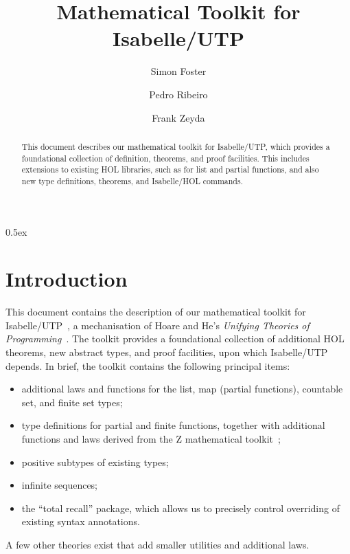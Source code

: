 \documentclass[11pt,a4paper]{article}
\begin{document}
\title{Mathematical Toolkit for Isabelle/UTP}

\author{Simon Foster \and Pedro Ribeiro \and Frank Zeyda}

\maketitle

\begin{abstract}
This document describes our mathematical toolkit for Isabelle/UTP, which provides a foundational
collection of definition, theorems, and proof facilities. This includes extensions to existing
HOL libraries, such as for list and partial functions, and also new type definitions, theorems, and 
Isabelle/HOL commands.
\end{abstract}

\tableofcontents

\parindent 0pt\parskip 0.5ex

\section{Introduction}

This document contains the description of our mathematical toolkit for 
Isabelle/UTP~\cite{Feliachi2010,Foster14c,Foster16a,Foster16c}, a mechanisation of Hoare and He's 
\emph{Unifying Theories of Programming}~\cite{Hoare&98,Cavalcanti&06}. The toolkit provides a 
foundational collection of additional HOL theorems, new abstract types, and proof facilities, upon 
which Isabelle/UTP depends. In brief, the toolkit contains the following principal items:

\begin{itemize}
  \item additional laws and functions for the list, map (partial functions), countable set, and finite set types;
  \item type definitions for partial and finite functions, together with additional functions and laws
    derived from the Z mathematical toolkit~\cite{zrm};
  \item positive subtypes of existing types;
  \item infinite sequences;
  \item the ``total recall'' package, which allows us to precisely control overriding of existing syntax 
    annotations.
\end{itemize}

A few other theories exist that add smaller utilities and additional laws.





\end{document}
